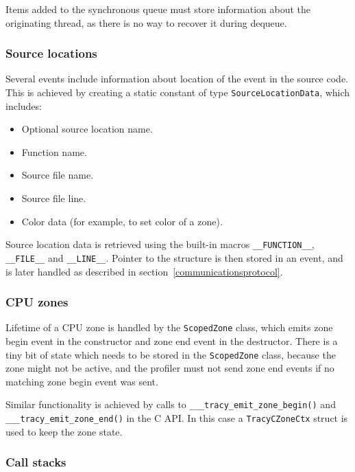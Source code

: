 \documentclass[hidelinks,titlepage,a4paper]{article}
\begin{document}
Items added to the synchronous queue must store information about the originating thread, as there is no way to recover it during dequeue.

\subsubsection{Source locations}

Several events include information about location of the event in the source code. This is achieved by creating a static constant of type \texttt{SourceLocationData}, which includes:

\begin{itemize}
\item Optional source location name.
\item Function name.
\item Source file name.
\item Source file line.
\item Color data (for example, to set color of a zone).
\end{itemize}

Source location data is retrieved using the built-in macros \texttt{\_\_FUNCTION\_\_}, \texttt{\_\_FILE\_\_} and \texttt{\_\_LINE\_\_}. Pointer to the structure is then stored in an event, and is later handled as described in section~\ref{communicationsprotocol}.

\subsubsection{CPU zones}
\label{cpuzones}

Lifetime of a CPU zone is handled by the \texttt{ScopedZone} class, which emits zone begin event in the constructor and zone end event in the destructor. There is a tiny bit of state which needs to be stored in the \texttt{ScopedZone} class, because the zone might not be active, and the profiler must not send zone end events if no matching zone begin event was sent.

Similar functionality is achieved by calls to \texttt{\_\_\_tracy\_emit\_zone\_begin()} and \texttt{\_\_\_tracy\_emit\_zone\_end()} in the C API. In this case a \texttt{TracyCZoneCtx} struct is used to keep the zone state.

\subsubsection{Call stacks}
\end{document}
